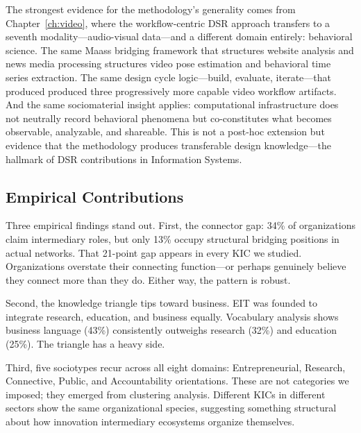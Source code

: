 \documentclass[../main.tex]{subfiles}
\begin{document}
The strongest evidence for the methodology's generality comes from Chapter~\ref{ch:video}, where the workflow-centric DSR approach transfers to a seventh modality---audio-visual data---and a different domain entirely: behavioral science. The same Maass bridging framework that structures website analysis and news media processing structures video pose estimation and behavioral time series extraction. The same design cycle logic---build, evaluate, iterate---that produced \RoleBox{} produced three progressively more capable video workflow artifacts. And the same sociomaterial insight applies: computational infrastructure does not neutrally record behavioral phenomena but co-constitutes what becomes observable, analyzable, and shareable. This is not a post-hoc extension but evidence that the methodology produces transferable design knowledge---the hallmark of DSR contributions in Information Systems.

\subsection{Empirical Contributions}

Three empirical findings stand out. First, the connector gap: 34\% of organizations claim intermediary roles, but only 13\% occupy structural bridging positions in actual networks. That 21-point gap appears in every KIC we studied. Organizations overstate their connecting function---or perhaps genuinely believe they connect more than they do. Either way, the pattern is robust.

Second, the knowledge triangle tips toward business. EIT was founded to integrate research, education, and business equally. Vocabulary analysis shows business language (43\%) consistently outweighs research (32\%) and education (25\%). The triangle has a heavy side.

Third, five sociotypes recur across all eight domains: Entrepreneurial, Research, Connective, Public, and Accountability orientations. These are not categories we imposed; they emerged from clustering analysis. Different KICs in different sectors show the same organizational species, suggesting something structural about how innovation intermediary ecosystems organize themselves.
\end{document}
